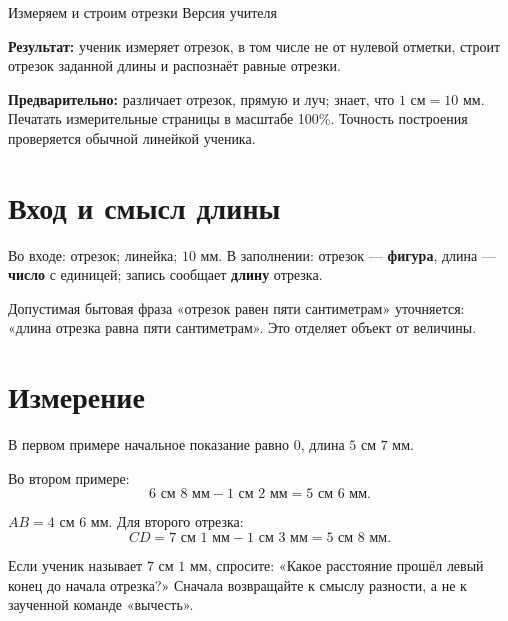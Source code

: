 \worksheettitle
  {Измеряем и строим отрезки}
  { Версия учителя}

\begin{teacherbox}
  \textbf{Результат:} ученик измеряет отрезок, в том числе не от нулевой
  отметки, строит отрезок заданной длины и распознаёт равные отрезки.

  \textbf{Предварительно:} различает отрезок, прямую и луч; знает, что
  $1\text{ см}=10\text{ мм}$. Печатать измерительные страницы в масштабе
  100\%. Точность построения проверяется обычной линейкой ученика.
\end{teacherbox}

\section{Вход и смысл длины}

Во входе: отрезок; линейка; $10$ мм. В заполнении: отрезок —
\textbf{фигура}, длина — \textbf{число} с единицей; запись сообщает
\textbf{длину} отрезка.

\segmentlengthfigure

\begin{teacherbox}
  Допустимая бытовая фраза «отрезок равен пяти сантиметрам» уточняется:
  «длина отрезка равна пяти сантиметрам». Это отделяет объект от величины.
\end{teacherbox}

\section{Измерение}

\correctmeasurementfigure

В первом примере начальное показание равно $0$, длина
$5\text{ см }7\text{ мм}$.

\shiftedmeasurementfigure

Во втором примере:
\[
  6\text{ см }8\text{ мм}-1\text{ см }2\text{ мм}
    =5\text{ см }6\text{ мм}.
\]

\readrulerpracticefigure

\begin{practicebox}
  $AB=4\text{ см }6\text{ мм}$. Для второго отрезка:
  \[
    CD=7\text{ см }1\text{ мм}-1\text{ см }3\text{ мм}
      =5\text{ см }8\text{ мм}.
  \]
\end{practicebox}

\begin{teacherbox}[Диагностика]
  Если ученик называет $7\text{ см }1\text{ мм}$, спросите: «Какое
  расстояние прошёл левый конец до начала отрезка?» Сначала возвращайте к
  смыслу разности, а не к заученной команде «вычесть».
\end{teacherbox}

